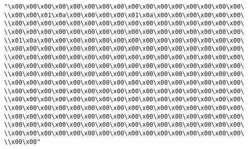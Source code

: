 \verb|"\x00\x00\x00\x00\x00\x00\x00\x00\x00\x00\x00\x00\x00\x00\x00\x00\|\newline
\verb|\\x00\x00\x01\x0a\x00\x00\x00\x00\x01\x0a\x00\x00\x00\x00\x00\x00\|\newline
\verb|\\x00\x00\x00\x00\x00\x00\x00\x00\x00\x00\x00\x00\x00\x00\x00\x00\|\newline
\verb|\\x00\x00\x00\x00\x00\x00\x00\x00\x00\x00\x00\x00\x00\x00\x00\x00\|\newline
\verb|\\x01\x0a\x00\x00\x00\x00\x00\x00\x00\x00\x00\x00\x00\x00\x00\x00\|\newline
\verb|\\x00\x00\x00\x00\x00\x00\x00\x00\x00\x00\x00\x00\x00\x00\x00\x00\|\newline
\verb|\\x00\x00\x00\x00\x00\x00\x00\x00\x00\x00\x00\x00\x00\x00\x00\x00\|\newline
\verb|\\x00\x00\x00\x00\x00\x00\x00\x00\x00\x00\x00\x00\x00\x00\x00\x00\|\newline
\verb|\\x00\x00\x00\x00\x00\x00\x00\x00\x00\x00\x00\x00\x00\x00\x00\x00\|\newline
\verb|\\x00\x00\x00\x00\x00\x00\x00\x00\x00\x00\x00\x00\x00\x00\x00\x00\|\newline
\verb|\\x00\x00\x00\x00\x00\x00\x00\x00\x00\x00\x00\x00\x00\x00\x00\x00\|\newline
\verb|\\x00\x00\x00\x00\x00\x00\x00\x00\x00\x00\x00\x00\x00\x00\x00\x00\|\newline
\verb|\\x00\x00\x00\x00\x00\x00\x00\x00\x00\x00\x00\x00\x00\x00\x00\x00\|\newline
\verb|\\x00\x00\x00\x00\x00\x00\x00\x00\x00\x00\x00\x00\x00\x00\x00\x00\|\newline
\verb|\\x00\x00\x00\x00\x00\x00\x00\x00\x00\x00\x00\x00\x00\x00\x00\x00\|\newline
\verb|\\x00\x00\x00\x00\x00\x00\x00\x00\x00\x00\x00\x00\x00\x00\x00\x00\|\newline
\verb|\\x00\x00"|\newline
